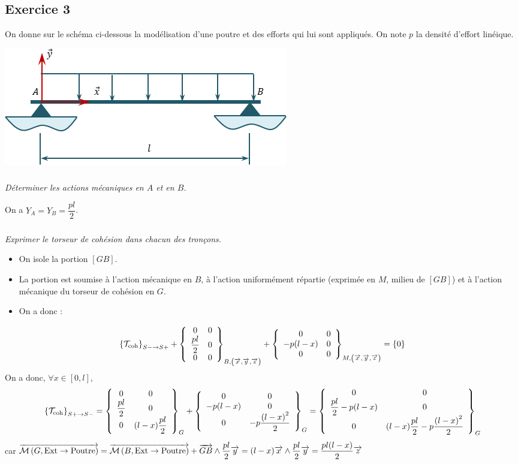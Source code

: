 \documentclass[10pt,fleqn]{article} %
\begin{document}
\begin{multicols}{2}
\section*{Exercice 3}
\setcounter{subparagraph}{0}
On donne sur le schéma ci-dessous la modélisation d'une poutre et des efforts qui lui sont appliqués. On note $p$ la densité d'effort linéique.
\begin{center}
\includegraphics[width=.45\textwidth]{images/exo_05}
\end{center}

\subparagraph{}
\textit{Déterminer les actions mécaniques en $A$ et en $B$.}
\ifprof
\begin{corrige}
On a $Y_A = Y_B = \dfrac{pl}{2}$.
\end{corrige}
\else 
\fi



\subparagraph{}
\textit{Exprimer le torseur de cohésion dans chacun des tronçons.}
\ifprof
\begin{corrige}
\begin{itemize}
\item On isole la portion $[GB]$.
\item La portion est soumise à l'action mécanique en $B$, à l'action uniformément répartie (exprimée en $M$, milieu de $[GB]$) et à l'action mécanique du torseur de cohésion en $G$.
\item On a donc : 
\end{itemize}
$$
\torseurscoh_{S-\rightarrow S+} +
 \torseurcol{0}{\dfrac{pl}{2}}{0}{0}{0}{0}{B,\left( \vect{x},\vect{y},\vect{z} \right)} 
 +\torseurcol{0}{-p(l-x)}{0}{0}{0}{0}{M,\left( \vect{x},\vect{y},\vect{z} \right)} 
 = \{0\}
$$
On a donc, $\forall x \in \left[0,l\right]$, 
$$
\torseurscoh_{S+\rightarrow S-}
= \torseurcol{0}{\dfrac{pl}{2}}{0}{0}{0}{(l-x)\dfrac{pl}{2}}{G} 
 +\torseurcol{0}{-p(l-x)}{0}{0}{0}{-p\dfrac{\left(l-x\right)^2}{2}}{G} 
 = \torseurcol{0}{\dfrac{pl}{2}-p(l-x)}{0}{0}{0}{(l-x)\dfrac{pl}{2}-p\dfrac{\left(l-x\right)^2}{2}}{G} 
$$
car 
$\vectm{G}{\text{Ext}}{\text{Poutre}}
=\vectm{B}{\text{Ext}}{\text{Poutre}} + \vect{GB}\wedge \dfrac{pl}{2} \vect{y}  
=  (l-x)\vect{x}  \wedge \dfrac{pl}{2} \vect{y}
=  \dfrac{pl(l-x)}{2} \vect{z}
$ 


\end{corrige}
\end{multicols}
\end{document}
